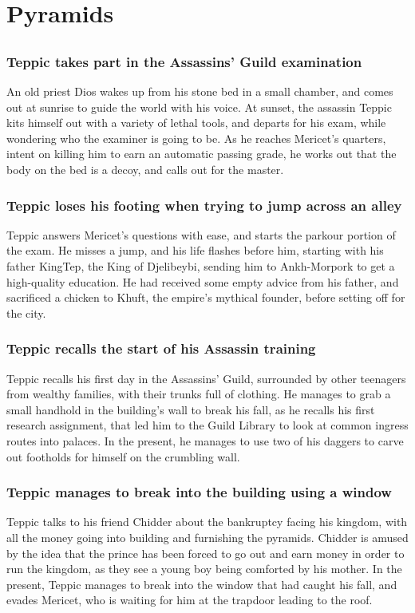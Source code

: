 \section{Pyramids}


\subsection{}
\subsubsection{\Gls{Teppic} takes part in the Assassins' Guild examination}
An old priest \Gls{Dios} wakes up from his stone bed in a small chamber, and comes out at sunrise
to guide the world with his voice. At sunset, the assassin \Gls{Teppic} kits himself out with a
variety of lethal tools, and departs for his exam, while wondering who the examiner is going to be.
As he reaches \Gls{Mericet}'s quarters, intent on killing him to earn an automatic passing grade,
he works out that the body on the bed is a decoy, and calls out for the master.

\subsubsection{\Gls{Teppic} loses his footing when trying to jump across an alley}
\Gls{Teppic} answers \Gls{Mericet}'s questions with ease, and starts the parkour portion of the
exam. He misses a jump, and his life flashes before him, starting with his father \Gls{KingTep},
the King of Djelibeybi, sending him to Ankh-Morpork to get a high-quality education. He had
received some empty advice from his father, and sacrificed a chicken to \Gls{Khuft}, the empire's
mythical founder, before setting off for the city.

\subsubsection{\Gls{Teppic} recalls the start of his Assassin training}
\Gls{Teppic} recalls his first day in the Assassins' Guild, surrounded by other teenagers from
wealthy families, with their trunks full of clothing. He manages to grab a small handhold in the
building's wall to break his fall, as he recalls his first research assignment, that led him to the
Guild Library to look at common ingress routes into palaces. In the present, he manages to use two
of his daggers to carve out footholds for himself on the crumbling wall.

\subsubsection{\Gls{Teppic} manages to break into the building using a window}
\Gls{Teppic} talks to his friend \Gls{Chidder} about the bankruptcy facing his kingdom, with all
the money going into building and furnishing the pyramids. \Gls{Chidder} is amused by the idea that
the prince has been forced to go out and earn money in order to run the kingdom, as they see
a young boy being comforted by his mother. In the present, \Gls{Teppic} manages to break into the
window that had caught his fall, and evades \Gls{Mericet}, who is waiting for him at the trapdoor
leading to the roof.

